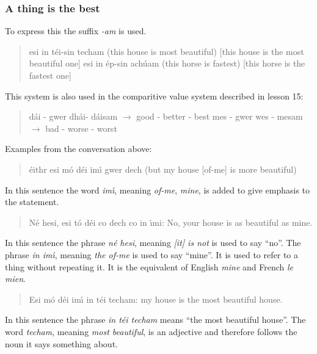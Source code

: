 \subsubsection{A thing is the best}

To express this the suffix \textit{-am} is used.

\begin{quote}
esi in t\'{e}i-sin techam (this house is most beautiful) [this house is the most beautiful one]
esi in \'{e}p-sin ach\'{u}am (this horse is fastest) [this horse is the fastest one]
\end{quote}

This system is also used in the comparitive value system described in lesson 15:

\begin{quote}
d\'{a}i - gwer dh\'{a}i- d\'{a}isam $\rightarrow$ good - better - best
mes - gwer wes - mesam $\rightarrow$ bad - worse - worst
\end{quote}

Examples from the conversation above:

\begin{quote}
\'{e}ithr esi m\'{o} d\'{e}i im\'{\i} gwer dech (but my house [of-me] is more beautiful)
\end{quote}

In this sentence the word \textit{im\'{\i}}, meaning \textit{of-me}, \textit{mine}, is added to give emphasis to the statement.

\begin{quote}
N\'{e} hesi, esi t\'{o} d\'{e}i co dech co in \'{\i}mi: No, your house is as beautiful as mine.
\end{quote}

In this sentence the phrase \textit{n\'{e} hesi}, meaning \textit{[it] is not} is used to say ``no''.
The phrase \textit{in im\'{\i}}, meaning \textit{the of-me} is used to say ``mine''. It is used to refer to a thing without repeating it. It is the equivalent of English \textit{mine} and French \textit{le mien}.

\begin{quote}
Esi m\'{o} d\'{e}i im\'{\i} in t\'{e}i techam: my house is the most beautiful house.
\end{quote}

In this sentence the phrase \textit{in t\'{e}i techam} means ``the most beautiful house''. The word \textit{techam}, meaning \textit{most beautiful}, is an adjective and therefore follows the noun it says something about.

